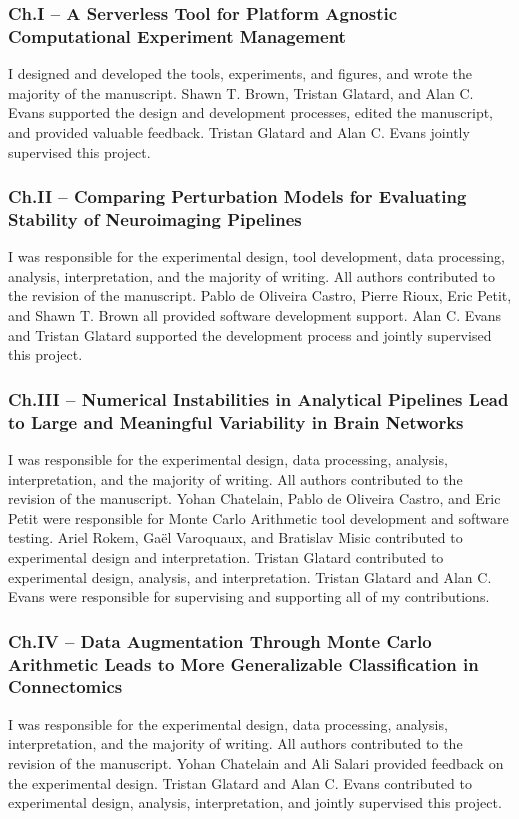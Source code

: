 \subsubsection*{Ch.I – A Serverless Tool for Platform Agnostic Computational Experiment Management}
I designed and developed the tools, experiments, and figures, and wrote the majority of the manuscript. Shawn T. Brown,
Tristan Glatard, and Alan C. Evans supported the design and development processes, edited the manuscript, and provided
valuable feedback. Tristan Glatard and Alan C. Evans jointly supervised this project.

\subsubsection*{Ch.II – Comparing Perturbation Models for Evaluating Stability of Neuroimaging Pipelines}
I was responsible for the experimental design, tool development, data processing, analysis, interpretation, and the
majority of writing. All authors contributed to the revision of the manuscript. Pablo de Oliveira Castro, Pierre Rioux,
Eric Petit, and Shawn T. Brown all provided software development support. Alan C. Evans and Tristan Glatard supported
the development process and jointly supervised this project.

\subsubsection*{Ch.III – Numerical Instabilities in Analytical Pipelines Lead to Large and Meaningful Variability in Brain
Networks}
I was responsible for the experimental design, data processing, analysis, interpretation, and the majority of writing.
All authors contributed to the revision of the manuscript. Yohan Chatelain, Pablo de Oliveira Castro, and Eric Petit
were responsible for Monte Carlo Arithmetic tool development and software testing. Ariel Rokem, Gaël Varoquaux, and
Bratislav Misic contributed to experimental design and interpretation. Tristan Glatard contributed to experimental
design, analysis, and interpretation. Tristan Glatard and Alan C. Evans were responsible for supervising and supporting
all of my contributions.

\subsubsection*{Ch.IV – Data Augmentation Through Monte Carlo Arithmetic Leads to More Generalizable Classification in
Connectomics}
I was responsible for the experimental design, data processing, analysis, interpretation, and the majority of writing.
All authors contributed to the revision of the manuscript. Yohan Chatelain and Ali Salari provided feedback on the
experimental design. Tristan Glatard and Alan C. Evans contributed to experimental design, analysis, interpretation,
and jointly supervised this project.

\clearpage
